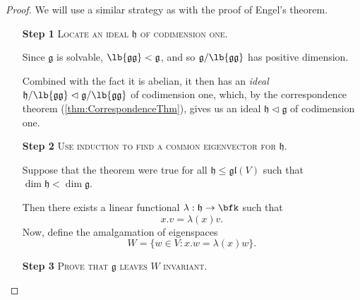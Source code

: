 \documentclass{article}
\newcommand*\tle{\ensuremath{\mathrel{\lhd}}}
\DeclarePairedDelimiter\lb\lbrack\rbrack
\newcommand*\frkg{{\ensuremath{\mathfrak{g}}}}
\newcommand*\frkh{{\ensuremath{\mathfrak{h}}}}
\newcommand*\glalg{\ensuremath{\mathfrak{gl}}}
\newcommand*\acts{.}
\begin{document}
\begin{proof} 
    We will use a similar strategy as with the proof of Engel's theorem.
    \begin{itemize}
        \item[\textbf{Step 1}] 
            \textsc{\color{Crimson} Locate an ideal $\frkh$ of codimension one.}

            Since $\frkg$ is solvable, $\lb{\frkg\frkg} < \frkg$, and so $\frkg/\lb{\frkg\frkg}$ has positive dimension.

            Combined with the fact it is abelian, it then has an \textit{ideal} $\frkh/\lb{\frkg\frkg} \tle \frkg/\lb{\frkg\frkg}$ of codimension one, which, by the correspondence theorem (\ref{thm:CorrespondenceThm}), gives us an ideal $\frkh \tle \frkg$ of codimension one.
        \item[\textbf{Step 2}]
            \textsc{\color{Crimson} Use induction to find a common eigenvector for $\frkh$.}

            Suppose that the theorem were true for all $\frkh \leq \glalg(V)$ such that $\dim \frkh < \dim \frkg$.

            Then there exists a linear functional $\lambda: \frkh \to \bfk$ such that
            \[
                x \acts v 
                =
                \lambda(x)v.
            \]
            Now, define the amalgamation of eigenspaces 
            \[
                W
                =
                \Big\{
                    w \in V:
                    x \acts w
                    =
                    \lambda(x)w
                \Big\}.
            \]
        \item[\textbf{Step 3}]
            \textsc{\color{Crimson} Prove that $\frkg$ leaves $W$ invariant.}


\end{itemize}
\end{proof}
\end{document}
